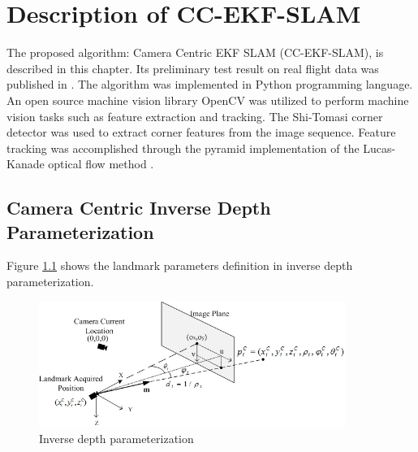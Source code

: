 \chapter{Description of CC-EKF-SLAM}\label{ch:algorithm}

The proposed algorithm: Camera Centric EKF SLAM (CC-EKF-SLAM), is
described in this chapter. Its preliminary test result on real flight
data was published in \cite{zhang_obstacle_2012}. The algorithm was
implemented in Python programming language\cite{_python_????}. An open
source machine vision library OpenCV\cite{_opencv_????} was utilized
to perform machine vision tasks such as feature extraction and
tracking. The Shi-Tomasi corner detector \cite{shi_good_1994} was used
to extract corner features from the image sequence. Feature tracking
was accomplished through the pyramid implementation of the Lucas-Kanade
optical flow method \cite{bouguet_pyramidal_1999}.

\section{Camera Centric Inverse Depth Parameterization}
Figure \ref{fig:algo1} shows the landmark parameters definition in inverse
depth parameterization.

\begin{figure}[h]
\centering
\includegraphics[width=10cm, keepaspectratio=true]{./Figures/idp.jpg}
\caption{Inverse depth parameterization}
\label{fig:algo1}
\end{figure}

